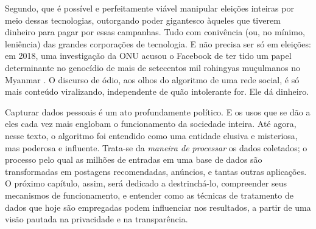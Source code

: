 Segundo, que é possível e perfeitamente viável manipular eleições inteiras por meio dessas tecnologias, outorgando poder gigantesco àqueles que tiverem dinheiro para pagar por essas campanhas.
Tudo com conivência (ou, no mínimo, leniência) das grandes corporações de tecnologia.
E não precisa ser só em eleições: em 2018, uma investigação da ONU acusou o Facebook de ter tido um papel determinante no genocídio de mais de setecentos mil rohingyas muçulmanos no Myanmar \cite{barron_could_2018}.
O discurso de ódio, aos olhos do algoritmo de uma rede social, é só mais conteúdo viralizando, independente de quão intolerante for.
Ele dá dinheiro.

Capturar dados pessoais é um ato profundamente político.
E os usos que se dão a eles cada vez mais englobam o funcionamento da sociedade inteira.
Até agora, nesse texto, o algoritmo foi entendido como uma entidade elusiva e misteriosa, mas poderosa e influente.
Trata-se da \textit{maneira de processar} os dados coletados; o processo pelo qual as milhões de entradas em uma base de dados são transformadas em postagens recomendadas, anúncios, e tantas outras aplicações.
O próximo capítulo, assim, será dedicado a destrinchá-lo, compreender seus mecanismos de funcionamento, e entender como as técnicas de tratamento de dados que hoje são empregadas podem influenciar nos resultados, a partir de uma visão pautada na privacidade e na transparência.